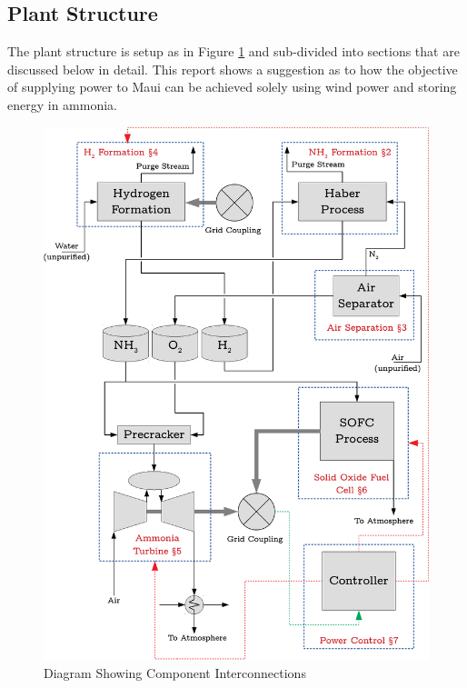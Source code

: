\subsection{Plant Structure}

The plant structure is setup as in Figure \ref{fig:plantglobaldiagram} and sub-divided into sections that are discussed below in detail.
This report shows a suggestion as to how the objective of supplying power to Maui can be achieved solely using wind power and storing energy in ammonia.

\begin{figure}[hb]
        \centering
        \includegraphics[scale=0.7]{plantdiagram.pdf}
        \caption{Diagram Showing Component Interconnections}
        \label{fig:plantglobaldiagram}
\end{figure}

